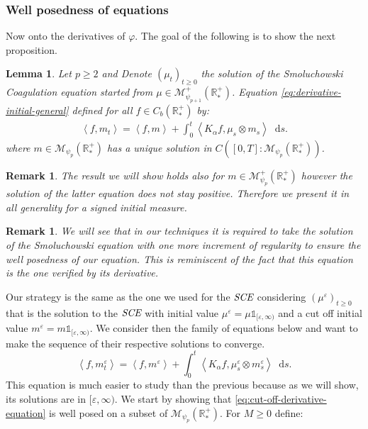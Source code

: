\documentclass[11pt,a4paper]{article}
\newcommand{\RR}{\mathbb{R}}
\newcommand{\RRP}{\mathbb{R}^+_*}
\newcommand{\MC}{\mathcal{M}}
\newcommand{\SCE}{\emph{SCE}}
\newcommand{\Proc}[1]{\left(#1\right)_{t\geq 0}}
\newcommand{\brac}[1]{\left\langle#1\right\rangle}
\newcommand{\dd}{\mathop{}\!\mathrm{d}}
\newtheorem{lemma}[theorem]{Lemma}
\newtheorem{remark}[theorem]{Remark}
\begin{document}
\subsubsection{Well posedness of equations}
Now onto the derivatives of $\varphi$. The goal of the following is to show the next proposition.
\begin{lemma}\label{lem:well_posedness_derivative_eq}
    Let $p \geq 2$ and Denote $\Proc{\mu_t}$ the solution of the Smoluchowski Coagulation equation started from $\mu \in \MC^+_{\psi_{p + 1}}\left(\RRP\right)$. Equation \eqref{eq:derivative-initial-general} defined for all $f \in C_b(\RR^+_*)$ by:
    \begin{align*}
        \brac{f,m_t} = \brac{f,m} + \int_0^t \brac{K_\alpha f,\mu_s\otimes m_s} \dd s.
    \end{align*}
    where $m \in \MC_{\psi_p}\left(\RRP\right)$ has a unique solution in $C\left([0,T]:\MC_{\psi_p}\left(\RRP\right)\right)$.
\end{lemma}
\begin{remark}
    The result we will show holds also for $m \in \MC^+_{\psi_p}\left(\RRP\right) $ however the solution of the latter equation does not stay positive. Therefore we present it in all generality for a signed initial measure.
\end{remark}
\begin{remark}
    We will see that in our techniques it is required to take the solution of the Smoluchowski equation with one more increment of regularity to ensure the well posedness of our equation. This is reminiscent of the fact that this equation is the one verified by its derivative.
\end{remark}
Our strategy is the same as the one we used for the $\SCE$ considering $\Proc{\mu^\varepsilon}$ that is the solution to the $\SCE$ with initial value $\mu^\varepsilon = \mu\mathds{1}_{[\varepsilon,\infty)}$ and a cut off initial value $m^\varepsilon = m\mathds{1}_{[\varepsilon,\infty)}$. We consider then the family of equations below and want to make the sequence of their respective solutions to converge.
\begin{equation}\label{eq:cut-off-derivative-equation}
    \brac{f,m^\varepsilon_t} = \brac{f,m^\varepsilon} + \int_0^t \brac{K_\alpha f,\mu^\varepsilon_s\otimes m^\varepsilon_s} \dd s.
\end{equation}
This equation is much easier to study than the previous because as we will show, its solutions are in $[\varepsilon,\infty)$. We start by showing that \eqref{eq:cut-off-derivative-equation} is well posed on a subset of $\MC_{\psi_p}\left(\RRP\right)$. For $M \geq 0$ define:
\end{document}
